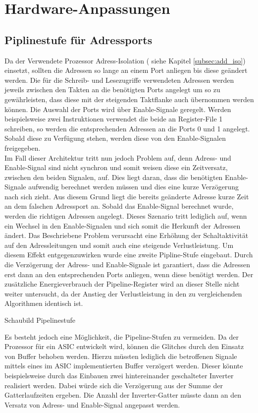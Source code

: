 \chapter{Hardware-Anpassungen}

\section{Piplinestufe für Adressports}
Da der Verwendete Prozessor Adress-Isolation ( siehe Kapitel \ref{subsec:add_iso}) einsetzt, sollten die Adressen so lange an einem Port anliegen bis diese geändert werden.
Die für die Schreib- und Lesezugriffe verwendeten Adressen werden jeweils zwischen den Takten an die benötigten Ports angelegt um so zu gewährleisten, dass diese mit der steigenden Taktflanke auch übernommen werden können. Die Auswahl der Ports wird über Enable-Signale geregelt. Werden beispielsweise zwei Instruktionen verwendet die beide an Register-File 1 schreiben, so werden die entsprechenden Adressen an die Ports 0 und 1 angelegt. Sobald diese zu Verfügung stehen, werden diese von den Enable-Signalen freigegeben.\\
Im Fall dieser Architektur tritt nun jedoch Problem auf, denn Adress- und Enable-Signal sind nicht synchron und somit weisen diese ein Zeitversatz, zwischen den beiden Signalen, auf. Dies liegt daran, dass die benötigten Enable-Signale aufwendig berechnet werden müssen und dies eine kurze Verzögerung nach sich zieht. Aus diesem Grund liegt die bereits geänderte Adresse kurze Zeit an dem falschen Adressport an. Sobald das Enable-Signal berechnet wurde, werden die richtigen Adressen angelegt. Dieses Szenario tritt lediglich auf, wenn ein Wechsel in den Enable-Signalen und sich somit die Herkunft der Adressen ändert. Das Beschriebene Problem verursacht eine Erhöhung der Schaltaktivität auf den Adressleitungen und somit auch eine steigende Verlustleistung. %
Um diesem Effekt entgegenzuwirken wurde eine zweite Pipline-Stufe eingebaut. Durch die Verzögerung der Adress- und Enable-Signale ist garantiert, dass die Adressen erst dann an den entsprechenden Ports anliegen, wenn diese benötigt werden. Der zusätzliche Energieverbrauch der Pipeline-Register wird an dieser Stelle nicht weiter untersucht, da der Anstieg der Verlustleistung in den zu vergleichenden Algorithmen identisch ist.

Schaubild Pipelinestufe

Es besteht jedoch eine Möglichkeit, die Pipeline-Stufen zu vermeiden.
Da der Prozessor für ein ASIC entwickelt wird, können die Glitches durch den Einsatz von Buffer behoben werden. Hierzu müssten lediglich die betroffenen Signale mittels eines im ASIC implementierten Buffer verzögert werden. Dieser könnte beispielsweise durch das Einbauen zwei hintereinander geschalteter Inverter realisiert werden. Dabei würde sich die Verzögerung aus der Summe der Gatterlaufzeiten ergeben. Die Anzahl der Inverter-Gatter müsste dann an den Versatz von Adress- und Enable-Signal angepasst werden. 

